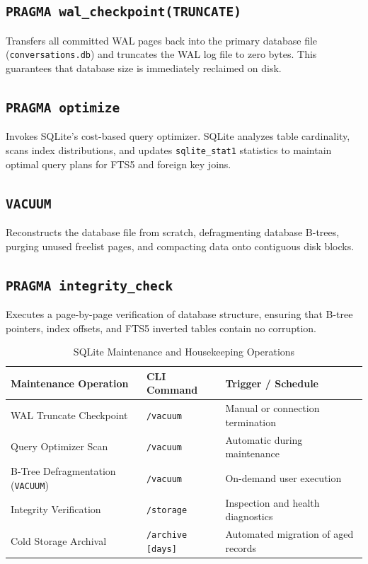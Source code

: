 \subsection{\texttt{PRAGMA wal\_checkpoint(TRUNCATE)}}
Transfers all committed WAL pages back into the primary database file (\texttt{conversations.db}) and truncates the WAL log file to zero bytes. This guarantees that database size is immediately reclaimed on disk.

\subsection{\texttt{PRAGMA optimize}}
Invokes SQLite's cost-based query optimizer. SQLite analyzes table cardinality, scans index distributions, and updates \texttt{sqlite\_stat1} statistics to maintain optimal query plans for FTS5 and foreign key joins.

\subsection{\texttt{VACUUM}}
Reconstructs the database file from scratch, defragmenting database B-trees, purging unused freelist pages, and compacting data onto contiguous disk blocks.

\subsection{\texttt{PRAGMA integrity\_check}}
Executes a page-by-page verification of database structure, ensuring that B-tree pointers, index offsets, and FTS5 inverted tables contain no corruption.

\begin{table}[htbp]
\centering
\small
\begin{tabular}{lll}
\toprule
\textbf{Maintenance Operation} & \textbf{CLI Command} & \textbf{Trigger / Schedule} \\
\midrule
WAL Truncate Checkpoint & \texttt{/vacuum} & Manual or connection termination \\
Query Optimizer Scan & \texttt{/vacuum} & Automatic during maintenance \\
B-Tree Defragmentation (\texttt{VACUUM}) & \texttt{/vacuum} & On-demand user execution \\
Integrity Verification & \texttt{/storage} & Inspection and health diagnostics \\
Cold Storage Archival & \texttt{/archive [days]} & Automated migration of aged records \\
\bottomrule
\end{tabular}
\caption{SQLite Maintenance and Housekeeping Operations}
\label{tab:maintenance_ops}
\end{table}

